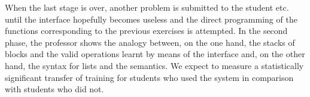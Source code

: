 When the last stage is over, another problem is submitted to the
student etc. until the interface hopefully becomes useless and the
direct programming of the \erlang functions corresponding to the
previous exercises is attempted. In the second phase, the professor
shows the analogy between, on the one hand, the stacks of blocks and
the valid operations learnt by means of the interface and, on the
other hand, the \erlang syntax for lists and the \erlang semantics. We
expect to measure a statistically significant transfer of training for
students who used the system in comparison with students who did not.

